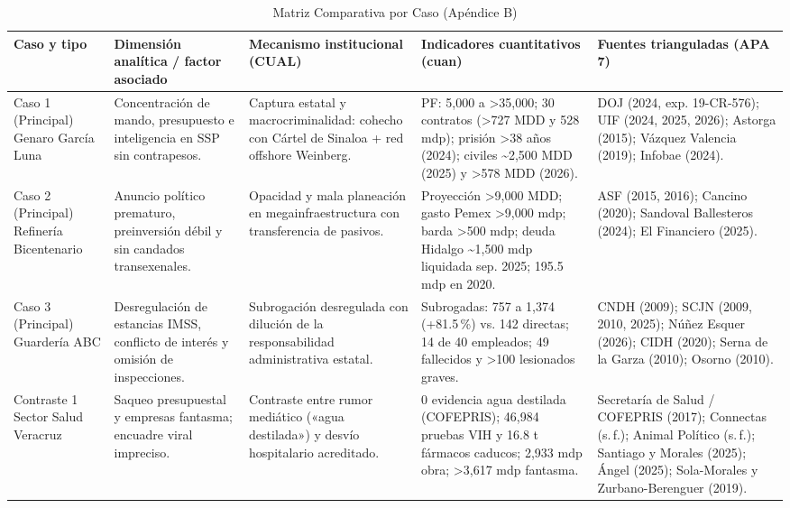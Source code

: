 \begin{landscape}
\begin{table}[H]
\centering
\caption{Matriz Comparativa por Caso (Apéndice B)}
\label{tab:matriz_comparativa}
\tiny
\begin{tabular}{@{}p{2cm}p{2.5cm}p{3.5cm}p{4cm}p{6.5cm}@{}}
\toprule
\textbf{Caso y tipo} & \textbf{Dimensión analítica / factor asociado} & \textbf{Mecanismo institucional (CUAL)} & \textbf{Indicadores cuantitativos (cuan)} & \textbf{Fuentes trianguladas (APA 7)} \\
\midrule
Caso 1 (Principal) \newline Genaro García Luna & Concentración de mando, presupuesto e inteligencia en SSP sin contrapesos. & Captura estatal y macrocriminalidad: cohecho con Cártel de Sinaloa + red offshore Weinberg. & PF: 5,000 a >35,000; 30 contratos (>727 MDD y 528 mdp); prisión >38 años (2024); civiles \textasciitilde2,500 MDD (2025) y >578 MDD (2026). & DOJ (2024, exp. 19-CR-576); UIF (2024, 2025, 2026); Astorga (2015); Vázquez Valencia (2019); Infobae (2024). \\
\addlinespace
Caso 2 (Principal) \newline Refinería Bicentenario & Anuncio político prematuro, preinversión débil y sin candados transexenales. & Opacidad y mala planeación en megainfraestructura con transferencia de pasivos. & Proyección >9,000 MDD; gasto Pemex >9,000 mdp; barda >500 mdp; deuda Hidalgo \textasciitilde1,500 mdp liquidada sep. 2025; 195.5 mdp en 2020. & ASF (2015, 2016); Cancino (2020); Sandoval Ballesteros (2024); El Financiero (2025). \\
\addlinespace
Caso 3 (Principal) \newline Guardería ABC & Desregulación de estancias IMSS, conflicto de interés y omisión de inspecciones. & Subrogación desregulada con dilución de la responsabilidad administrativa estatal. & Subrogadas: 757 a 1,374 (+81.5\,\%) vs. 142 directas; 14 de 40 empleados; 49 fallecidos y >100 lesionados graves. & CNDH (2009); SCJN (2009, 2010, 2025); Núñez Esquer (2026); CIDH (2020); Serna de la Garza (2010); Osorno (2010). \\
\addlinespace
Contraste 1 \newline Sector Salud Veracruz & Saqueo presupuestal y empresas fantasma; encuadre viral impreciso. & Contraste entre rumor mediático («agua destilada») y desvío hospitalario acreditado. & 0 evidencia agua destilada (COFEPRIS); 46,984 pruebas VIH y 16.8 t fármacos caducos; 2,933 mdp obra; >3,617 mdp fantasma. & Secretaría de Salud / COFEPRIS (2017); Connectas (s.\,f.); Animal Político (s.\,f.); Santiago y Morales (2025); Ángel (2025); Sola-Morales y Zurbano-Berenguer (2019). \\

\end{tabular}
\end{table}
\end{landscape}
